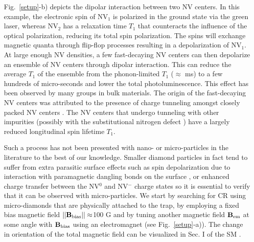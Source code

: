 \documentclass[preprintnumbers,amsmath,amssymb,superscriptaddress,twocolumn,showpacs]{revtex4-1}
\begin{document}
Fig.~\ref{setup}-b) depicts the dipolar interaction between two NV centers. In this example, the electronic spin of NV$_1$ is polarized in the ground state via the green laser, whereas NV$_2$ has a relaxation time $T_1$ that counteracts the influence of the optical polarization, reducing its total spin polarization. The spins will exchange magnetic quanta through flip-flop processes resulting in a depolarization of NV$_1$. At large enough NV densities, a few fast-decaying NV centers can then depolarize an ensemble of NV centers through dipolar interaction. This can reduce the average $T_1$ of the ensemble from the phonon-limited $T_1$ ($\approx$ ms) to a few hundreds of micro-seconds \cite{Jarmola} and lower the total photoluminescence. 
This effect has been observed by many groups \cite{van_oort_cross-relaxation_1989, armstrong_nvnv_2010, jarmola_longitudinal_2015, akhmedzhanov_microwave-free_2017, akhmedzhanov_magnetometry_2019, holliday_optical_1989, mrozek_longitudinal_2015, choi_depolarization_2017} in bulk materials. The origin of the fast-decaying NV centers was attributed to the presence of charge tunneling amongst closely packed NV centers \cite{choi_depolarization_2017}. The NV centers that undergo tunneling with other impurities (possibly with the substitutional nitrogen defect \cite{manson_nv_2018}) have a largely reduced longitudinal spin lifetime $T_1$.

Such a process has not been presented with nano- or micro-particles in the literature to the best of our knowledge. Smaller diamond particles in fact tend to suffer from extra parasitic surface effects such as spin depolarization due to interaction with paramagnetic dangling bonds on the surface \cite{Tetienne}, or enhanced charge transfer between the NV$^0$ and NV$^-$ charge states \cite{Dhomkar} so it is essential to verify that it can be observed with micro-particles. 
We start by searching for CR using micro-diamonds that are physically attached to the trap, by employing a fixed bias magnetic field $||\bf B_{\rm bias}||\approx$100 G and by tuning another magnetic field $\bf B_{\rm em}$ at some angle with $\bf B_{\rm bias}$ using an electromagnet (see Fig.~\ref{setup}-a)). The change in orientation of the total magnetic field can be visualized in Sec. I of the SM \cite{SM_CR_meca}.
\end{document}

